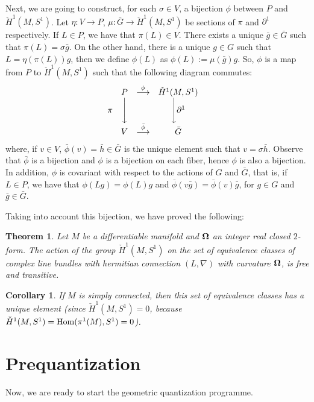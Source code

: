 \documentclass[12pt]{article}
\theoremstyle{plain}
\newtheorem{teor}{Theorem}
\newtheorem{corol}{Corollary}
\def\mapping#1{\mathrel{\mathop{\longrightarrow}\limits^{#1}}}
\def\curv{{\bf \Omega}}
\begin{document}
Next, we are going to construct, for each $\sigma \in V$, a bijection
$\phi$
between $P$ and $\check H^1(M,S^1)$.
Let $\eta \colon V \to P$, $\mu \colon \bar G \to \check H^1(M,S^1)$
be sections of $\pi$ and $\partial^1$ respectively.
If $L \in P$, we have that $\pi (L) \in V$.
There exists a unique $\bar g \in \bar G$
such that $\pi (L) = \sigma \bar g$.
On the other hand, there is a unique $g \in G$
such that $L = \eta (\pi (L))g$,
then we define $\phi (L)$ as
$\phi (L) := \mu(\bar g)g$. So,
$\phi$ is a map from $P$ to $\check H^1(M,S^1)$
such that the following diagram commutes:
$$
\begin{array}{ccccc}
& P & \mapping{\phi} & \check H^1(M,S^1) &
\\
\pi & \Bigg\downarrow & & \Bigg\downarrow  \partial^1 &
\\
& V & \mapping{\bar \phi} & \bar G &
\end{array}
$$
where, if $v \in V$,
$\bar \phi (v) = \bar h \in \bar G$
is the unique element such that
$v = \sigma \bar h$.
Observe that $\bar \phi$ is a bijection and $\phi$ is a bijection
on each fiber, hence $\phi$ is also a bijection.
In addition, $\phi$ is covariant with respect to
the actions of $G$ and $\bar G$,
that is, if $L \in P$, we have that
$\phi (Lg) = \phi (L)g$ and
$\bar \phi (v \bar g) = \bar \phi (v) \bar g$,
for $g \in G$ and $\bar g \in \bar G$.

Taking into account this bijection, we have proved the following:

\begin{teor}
Let $M$ be a differentiable manifold
and $\curv$ an integer real closed $2$-form.
The action of the group $\check H^1(M,S^1)$
on the set of equivalence classes of complex line bundles
with hermitian connection $(L,\nabla )$
with curvature $\curv$, is free and transitive.
\end{teor}

\begin{corol}
If $M$ is simply connected,
then this set of equivalence classes has a unique element
(since $\check H^1(M,S^1) = 0$,
because
$\check H^1(M,S^1) = {\rm Hom} (\pi^1(M),S^1) = 0$).
\end{corol}




\section{Prequantization}
\protect\label{prequa}


Now, we are ready to start the geometric quantization programme.
\end{document}
